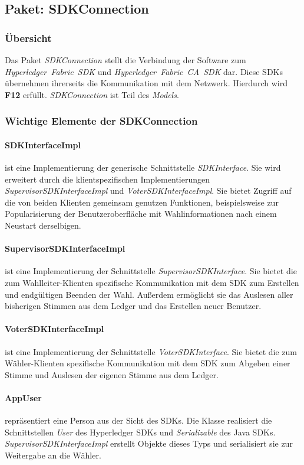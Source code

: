 \documentclass[parskip=full]{scrartcl}
\newcommand{\textitx}[1]{\mbox{\textit{#1}}}
\begin{document}
	\subsection{Paket: SDKConnection}
	\subsubsection{Übersicht}
	Das Paket \textitx{SDKConnection} stellt die Verbindung der Software zum \textitx{Hyperledger Fabric SDK} und \textitx{Hyperledger Fabric CA SDK} dar. Diese SDKs übernehmen ihrerseits die Kommunikation mit dem Netzwerk. Hierdurch wird \textbf{F12} erfüllt. \textitx{SDKConnection} ist Teil des \textitx{Models}.
	\subsubsection{Wichtige Elemente der SDKConnection}
	\paragraph{SDKInterfaceImpl} ist eine Implementierung der generische Schnittstelle \textitx{SDKInterface}. Sie wird erweitert durch die klientspezifischen Implementierungen \textit{SupervisorSDKInterfaceImpl} und \textit{VoterSDKInterfaceImpl}. Sie bietet Zugriff auf die von beiden Klienten gemeinsam genutzen Funktionen, beispielsweise zur Popularisierung der Benutzeroberfläche mit Wahlinformationen nach einem Neustart derselbigen.
	\paragraph{SupervisorSDKInterfaceImpl} ist eine Implementierung der Schnittstelle \textit{SupervisorSDKInterface}. Sie bietet die zum Wahlleiter-Klienten spezifische Kommunikation mit dem SDK zum Erstellen und endgültigen Beenden der Wahl. Außerdem ermöglicht sie das Auslesen aller bisherigen Stimmen aus dem Ledger und das Erstellen neuer Benutzer.
	\paragraph{VoterSDKInterfaceImpl} ist eine Implementierung der Schnittstelle \textit{VoterSDKInterface}. Sie bietet die zum Wähler-Klienten spezifische Kommunikation mit dem SDK zum Abgeben einer Stimme und Auslesen der eigenen Stimme aus dem Ledger.
	\paragraph{AppUser} repräsentiert eine Person aus der Sicht des SDKs. Die Klasse realisiert die Schnittstellen \textitx{User} des Hyperledger SDKs und \textitx{Serializable} des Java SDKs. \textit{SupervisorSDKInterfaceImpl} erstellt Objekte dieses Typs und serialisiert sie zur Weitergabe an die Wähler.
\end{document}
